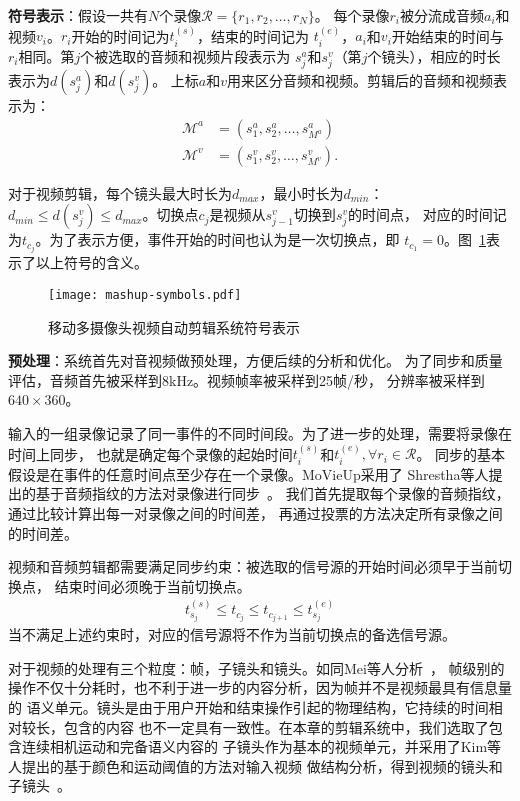 \textbf{符号表示}：假设一共有$N$个录像$\mathcal{R}=\{r_1, r_2, \ldots, r_N\}$。
每个录像$r_i$被分流成音频$a_i$和视频$v_i$。$r_i$开始的时间记为$t_i^{(s)}$，结束的时间记为
$t_i^{(e)}$，$a_i$和$v_i$开始结束的时间与$r_i$相同。第$j$个被选取的音频和视频片段表示为
$s_j^a$和$s_j^v$（第$j$个镜头），相应的时长表示为$d(s_j^a)$和$d(s_j^v)$。
上标$a$和$v$用来区分音频和视频。剪辑后的音频和视频表示为：
\begin{eqnarray*}
	\mathcal{M}^a &= (s_1^a, s_2^a,\ldots, s_{M^a}^a) \\
	\mathcal{M}^v &= (s_1^v, s_2^v,\ldots, s_{M^v}^v).
\end{eqnarray*}

对于视频剪辑，每个镜头最大时长为$d_{max}$，最小时长为$d_{min}$：$d_{min} \leq
d(s_j^v) \leq d_{max}$。切换点$c_j$是视频从$s_{j-1}^v$切换到$s_j^v$的时间点，
对应的时间记为$t_{c_j}$。为了表示方便，事件开始的时间也认为是一次切换点，即
$t_{c_1} = 0$。图~\ref{fig:mashup-symbols}表示了以上符号的含义。
\begin{figure}[ht]
    \centering
    \texttt{[image: mashup-symbols.pdf]}
    \caption{移动多摄像头视频自动剪辑系统符号表示}
    \label{fig:mashup-symbols}
\end{figure}

\textbf{预处理}：系统首先对音视频做预处理，方便后续的分析和优化。
为了同步和质量评估，音频首先被采样到8kHz。视频帧率被采样到25帧/秒，
分辨率被采样到$640\times 360$。

输入的一组录像记录了同一事件的不同时间段。为了进一步的处理，需要将录像在时间上同步，
也就是确定每个录像的起始时间$t_i^{(s)}$和$t_i^{(e)},\forall r_i \in \mathcal{R}$。
同步的基本假设是在事件的任意时间点至少存在一个录像。MoVieUp采用了
Shrestha等人提出的基于音频指纹的方法对录像进行同步~\cite{shresthabws10}。
我们首先提取每个录像的音频指纹，通过比较计算出每一对录像之间的时间差，
再通过投票的方法决定所有录像之间的时间差。

视频和音频剪辑都需要满足同步约束：被选取的信号源的开始时间必须早于当前切换点，
结束时间必须晚于当前切换点。
\begin{eqnarray}
    t_{s_j}^{(s)} \leq t_{c_j} \leq t_{c_{j+1}} \leq t_{s_j}^{(e)}
\end{eqnarray}
当不满足上述约束时，对应的信号源将不作为当前切换点的备选信号源。

对于视频的处理有三个粒度：帧，子镜头和镜头。如同Mei等人分析~\cite{MeiHZZL07}，
帧级别的操作不仅十分耗时，也不利于进一步的内容分析，因为帧并不是视频最具有信息量的
语义单元。镜头是由于用户开始和结束操作引起的物理结构，它持续的时间相对较长，包含的内容
也不一定具有一致性。在本章的剪辑系统中，我们选取了包含连续相机运动和完备语义内容的
子镜头作为基本的视频单元，并采用了Kim等人提出的基于颜色和运动阈值的方法对输入视频
做结构分析，得到视频的镜头和子镜头~\cite{KimCKK00}。

